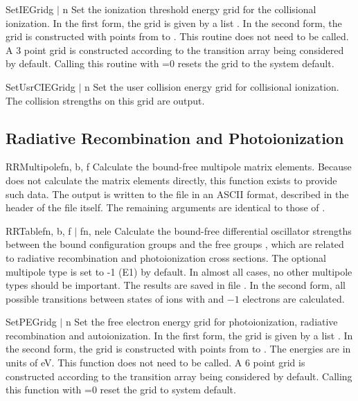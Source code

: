 \begin{fundesc}{SetIEGrid}{g $\mid$ n}
Set the ionization threshold energy grid for the collisional ionization. In
the first form, the grid is given by a list . In the second
form, the grid is constructed with  points from  to
. This routine does not need to be called. A 3 point grid is
constructed according to the transition array being considered by default.
Calling this routine with =0 resets the grid to the system default.
\end{fundesc}

\begin{fundesc}{SetUsrCIEGrid}{g $\mid$ n}
Set the user collision energy grid for collisional ionization. The collision
strengths on this grid are output.
\end{fundesc}



\subsection{Radiative Recombination and Photoionization}

\begin{fundesc}{RRMultipole}{fn, b, f}
Calculate the bound-free multipole matrix elements. Because 
does not calculate the matrix elements directly, this function exists to provide
such data. The output is written to the file  in an ASCII format,
described in the header of the file itself. The remaining arguments are
identical to those of .
\end{fundesc}

\begin{fundesc}{RRTable}{fn, b, f $\mid$ fn, nele}
Calculate the bound-free differential oscillator strengths between the bound
configuration groups  and the free groups , which are related to
radiative recombination and photoionization cross sections. The optional
multipole type  is set to -1 (E1) by default. In almost all cases, no
other multipole types should be important. The results are saved in file
. In the second form, all possible transitions between states of ions
with  and $-1$ electrons are calculated.
\end{fundesc}


\begin{fundesc}{SetPEGrid}{g $\mid$ n}
Set the free electron energy grid for photoionization, radiative recombination
and autoionization. In the first form, the grid is given by a list
. In the second form, the grid is constructed with  points from
 to . The energies are in units of eV. This function does not
need to be called. A 6 point grid is constructed according to the transition
array being considered by default. Calling this function with =0 reset
the grid to system default.
\end{fundesc}

